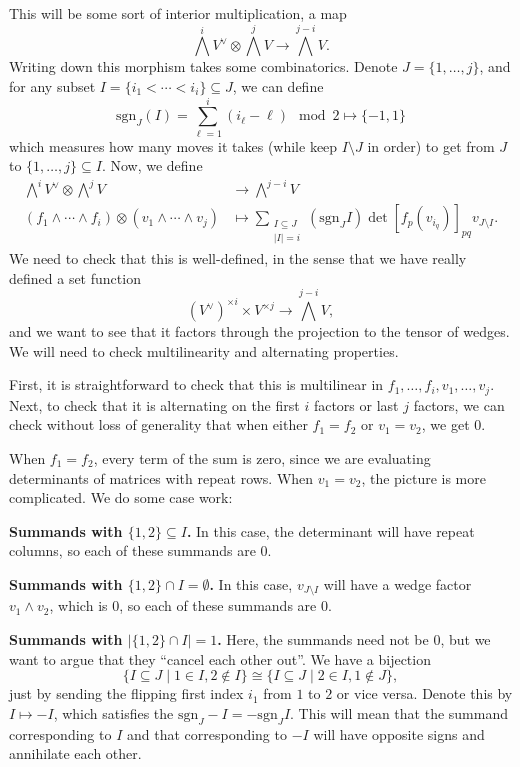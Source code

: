 \documentclass[12pt]{article}
\newcommand{\sgn}{\mathrm{sgn}}
\begin{document}
This will be some sort of interior multiplication, a map
\[\bigwedge^i V^\vee \otimes \bigwedge^j V \longrightarrow \bigwedge^{j-i} V.\]
Writing down this morphism takes some combinatorics. Denote $J=\{1,\dots,j\}$, and for any subset $I=\{i_1<\cdots<i_i\}\subseteq J$, we can define
\[\sgn_J(I) = \sum_{\ell=1}^i (i_\ell-\ell) \mod{2} \mapsto \{-1,1\}\]
which measures how many moves it takes (while keep $I\setminus J$ in order) to get from $J$ to $\{1,\dots,j\} \subseteq I$. Now, we define
\begin{align*}
    \bigwedge^i V^\vee \otimes \bigwedge^j V &\longrightarrow \bigwedge^{j-i} V\\
    (f_1\wedge \cdots \wedge f_i) \otimes (v_1\wedge \cdots \wedge v_j) &\longmapsto \sum_{\substack{I\subseteq J\\ |I|=i}} (\sgn_J I) \det[f_p(v_{i_q})]_{pq} v_{J\setminus I}.
\end{align*}
We need to check that this is well-defined, in the sense that we have really defined a set function
\[(V^\vee)^{\times i} \times V^{\times j} \to \bigwedge^{j-i} V,\]
and we want to see that it factors through the projection to the tensor of wedges. We will need to check multilinearity and alternating properties.

First, it is straightforward to check that this is multilinear in $f_1,\dots,f_i,v_1,\dots,v_j$. Next, to check that it is alternating on the first $i$ factors or last $j$ factors, we can check without loss of generality that when either $f_1=f_2$ or $v_1=v_2$, we get 0.

When $f_1=f_2$, every term of the sum is zero, since we are evaluating determinants of matrices with repeat rows. When $v_1=v_2$, the picture is more complicated. We do some case work:

\textbf{Summands with $\{1,2\}\subseteq I$.} In this case, the determinant will have repeat columns, so each of these summands are 0.

\textbf{Summands with $\{1,2\}\cap I = \emptyset$.} In this case, $v_{J\setminus I}$ will have a wedge factor $v_1\wedge v_2$, which is 0, so each of these summands are 0.

\textbf{Summands with $|\{1,2\}\cap I|=1$.} Here, the summands need not be 0, but we want to argue that they ``cancel each other out''. We have a bijection
\[\{I\subseteq J \mid 1\in I, 2\not\in I\} \cong \{I \subseteq J \mid 2\in I, 1\not\in J\},\]
just by sending the flipping first index $i_1$ from $1$ to $2$ or vice versa. Denote this by $I\mapsto -I$, which satisfies the $\sgn_J -I = -\sgn_J I$. This will mean that the summand corresponding to $I$ and that corresponding to $-I$ will have opposite signs and annihilate each other.
\end{document}
